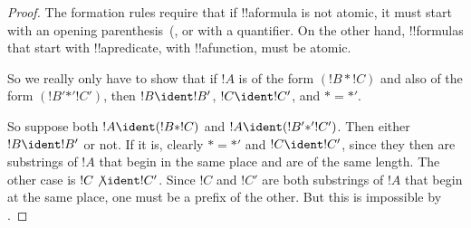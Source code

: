 \documentclass[../../include/open-logic-section]{subfiles}
\begin{document}
\begin{proof}
The formation rules require that if !!a{formula} is not atomic, it
must start with an opening parenthesis~(, 
or with a quantifier. On the other hand, !!{formula}s that start with
!!a{predicate}, with !!a{function},  must be atomic.

So we really only have to show that if $!A$ is of the form $(!B \ast
!C)$ and also of the form $(!B' \mathbin{\ast'} !C')$, then $!B \ident
!B'$, $!C \ident !C'$, and $\ast = {\ast'}$.  

So suppose both $!A \ident (!B \ast !C)$ and $!A \ident (!B'
\mathbin{\ast'} !C')$.  Then either $!B \ident !B'$ or not.  If it is,
clearly $\ast = {\ast'}$ and $!C \ident !C'$, since they then are
substrings of $!A$ that begin in the same place and are of the same
length.  The other case is $!C \not\ident !C'$.  Since $!C$ and
$!C'$ are both substrings of $!A$ that begin at the same place, one
must be a prefix of the other.  But this is impossible by
.
\end{proof}
\end{document}
